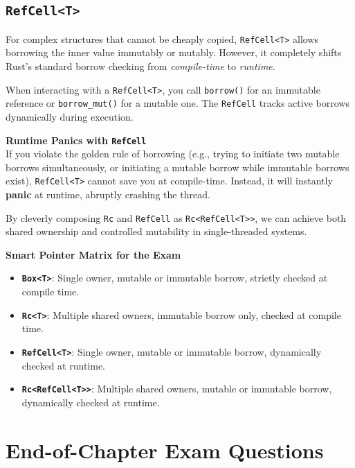 \subsection{\texttt{RefCell<T>}}
For complex structures that cannot be cheaply copied, \texttt{RefCell<T>} allows borrowing the inner value immutably or mutably. However, it completely shifts Rust's standard borrow checking from \textit{compile-time} to \textit{runtime}. 

When interacting with a \texttt{RefCell<T>}, you call \texttt{borrow()} for an immutable reference or \texttt{borrow\_mut()} for a mutable one. The \texttt{RefCell} tracks active borrows dynamically during execution. 

\begin{warningbox}
\textbf{Runtime Panics with \texttt{RefCell}} \\
If you violate the golden rule of borrowing (e.g., trying to initiate two mutable borrows simultaneously, or initiating a mutable borrow while immutable borrows exist), \texttt{RefCell<T>} cannot save you at compile-time. Instead, it will instantly \textbf{panic} at runtime, abruptly crashing the thread. 
\end{warningbox}

By cleverly composing \texttt{Rc} and \texttt{RefCell} as \texttt{Rc<RefCell<T>>}, we can achieve both shared ownership and controlled mutability in single-threaded systems.

\begin{exambox}
\textbf{Smart Pointer Matrix for the Exam}
\begin{itemize}
    \item \textbf{\texttt{Box<T>}}: Single owner, mutable or immutable borrow, strictly checked at compile time.
    \item \textbf{\texttt{Rc<T>}}: Multiple shared owners, immutable borrow only, checked at compile time.
    \item \textbf{\texttt{RefCell<T>}}: Single owner, mutable or immutable borrow, dynamically checked at runtime.
    \item \textbf{\texttt{Rc<RefCell<T>>}}: Multiple shared owners, mutable or immutable borrow, dynamically checked at runtime.
\end{itemize}
\end{exambox}

\section*{End-of-Chapter Exam Questions}

